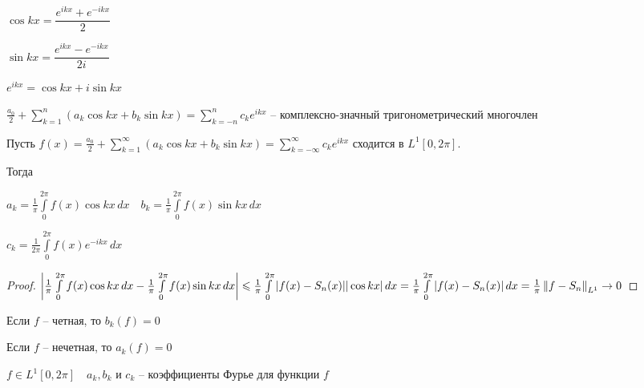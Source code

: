 \begin{remark}\thmslashn
	
	$\cos kx = \dfrac{e^{ikx} + e^{-ikx}}{2}$
	
	$\sin kx = \dfrac{e^{ikx} - e^{-ikx}}{2i}$
	
	$e^{ikx} = \cos kx + i\sin kx$
	
	$\frac{a_0}{2} + \sum\limits_{k =1}^{n}\left( a_k \cos kx + b_k\sin kx \right) = \sum\limits_{k =-n}^{n}c_k e^{ikx}$ -- комплексно-значный тригонометрический многочлен
	
\end{remark}

\begin{lemma}\thmslashn
	
	Пусть $f(x) = \frac{a_0}{2} + \sum\limits_{k =1}^{\infty}\left( a_k \cos kx + b_k\sin kx \right) = \sum\limits_{k = -\infty}^{\infty}c_k e^{ikx}$ сходится в $L^1[0, 2\pi]$. 
	
	Тогда 
	
	$a_k = \frac{1}{\pi} \int\limits_{0}^{2\pi} f(x) \cos kx \,dx\quad b_k = \frac{1}{\pi} \int\limits_{0}^{2\pi} f(x) \sin kx \,dx$
	
	$c_k = \frac{1}{2\pi} \int\limits_{0}^{2\pi} f(x) e^{-ikx} \,dx$
	
\end{lemma}

\begin{proof}\thmslashn 
	
	$\left| \frac{1}{\pi} \int\limits_{0}^{2\pi} f(x) \cos kx \,dx -  \frac{1}{\pi} \int\limits_{0}^{2\pi} f(x) \sin kx \,dx\right| \leqslant \frac{1}{\pi} \int\limits_0^{2\pi} |f(x) - S_n(x)| |\cos{kx}|\,dx = \frac{1}{\pi} \int\limits_0^{2\pi} |f(x) - S_n(x)|\,dx = \frac{1}{\pi}\left\|f - S_n\right\|_{L^1} \to 0$
	
\end{proof}

\begin{remark}\thmslashn
	
	Если $f$ -- четная, то $b_k(f) = 0$
	
	Если $f$ -- нечетная, то $a_k(f) = 0$
	
\end{remark}

\begin{definition}\thmslashn
	
	$f\in L^1[0, 2\pi]\quad a_k, b_k$ и $c_k$ -- коэффициенты Фурье для функции $f$
	
\end{definition}

